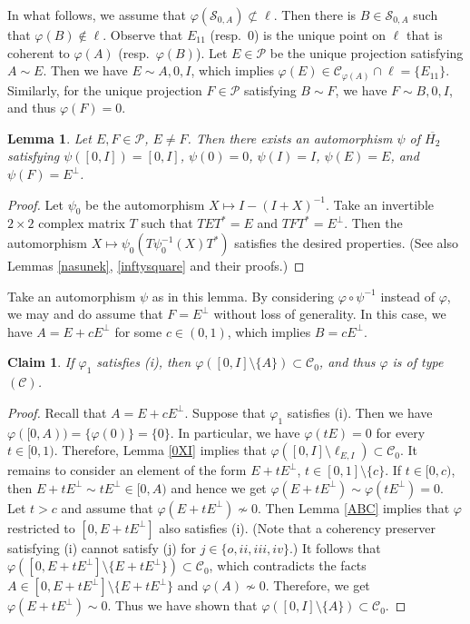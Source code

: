 \documentclass[10pt]{amsart}
\newtheorem{lemma}[theorem]{Lemma}
\newtheorem{claim}[theorem]{Claim}
\theoremstyle{definition}
\theoremstyle{remark}
\numberwithin{subsection}{section}
\numberwithin{equation}{section}
\newcommand\cC{{\mathcal{C}}}
\newcommand\cP{{\mathcal{P}}}
\newcommand\oH{{\overline{H_2}}}
\begin{document}
In what follows, we assume that $\varphi(\mathcal{S}_{0, A})\not\subset \ell$.
Then there is $B\in \mathcal{S}_{0, A}$ such that $\varphi(B)\notin \ell$. 
Observe that $E_{11}$ (resp.\ $0$) is the unique point on $\ell$ that is coherent to $\varphi(A)$ (resp.\ $\varphi(B)$).
Let $E\in\mathcal{P}$ be the unique projection satisfying $A\sim E$.
Then we have $E\sim A, 0, I$, which implies $\varphi(E)\in \cC_{\varphi(A)} \cap \ell=\{E_{11}\}$. 
Similarly, for the unique projection $F\in\mathcal{P}$ satisfying $B\sim F$, we have $F\sim B, 0, I$, and thus $\varphi(F)=0$. 

\begin{lemma}\label{kicmabol}
Let $E,F \in \cP$, $E \not= F$. 
Then there exists an automorphism $\psi$ of $\oH$ satisfying $\psi([0,I])=[0,I]$,  $\psi (0) = 0$, $\psi (I) = I$, $\psi (E) = E$, and $\psi (F) = E^\perp$.
\end{lemma}
\begin{proof}
Let $\psi_0$ be the automorphism $X\mapsto I-(I+X)^{-1}$.
Take an invertible $2 \times 2$ complex matrix $T$ such that $TET^\ast = E$ and $TFT^\ast = E^\perp$. 
Then the automorphism $X\mapsto \psi_0(T\psi_0^{-1}(X)T^\ast)$ satisfies the desired properties.
(See also Lemmas \ref{nasunek}, \ref{inftysquare} and their proofs.)
\end{proof}

Take an automorphism $\psi$ as in this lemma. 
By considering $\varphi\circ \psi^{-1}$ instead of $\varphi$, we may and do assume that $F=E^\perp$ without loss of generality. 
In this case, we have $A=E+cE^\perp$ for some $c\in (0,1)$,  which implies $B=cE^\perp$. 




\begin{claim}\label{1i}
If $\varphi_1$ satisfies (i), then $\varphi([0, I]\setminus\{A\})\subset \cC_0$, and thus $\varphi$ is of type $(\mathcal{C})$.
\end{claim}
\begin{proof}
Recall that $A=E+cE^\perp$.
Suppose that $\varphi_1$ satisfies (i).
Then we have $\varphi([0, A)) =\{\varphi(0)\}=\{0\}$. 
In particular, we have $\varphi(tE)=0$ for every $t\in [0,1)$. 
Therefore, Lemma \ref{0XI} implies that $\varphi([0,I]\setminus\ell_{E, I})\subset \cC_0$.
It remains to consider an element of the form $E+tE^\perp$, $t\in [0,1]\setminus\{c\}$.
If $t\in [0,c)$, then $E+tE^\perp\sim tE^\perp\in [0,A)$ and hence we get $\varphi(E+tE^\perp)\sim \varphi(tE^\perp)=0$.
Let $t>c$
and assume that $\varphi(E+tE^\perp)\not\sim 0$.
Then Lemma \ref{ABC} implies that $\varphi$ restricted to $[0,E+tE^\perp]$ also satisfies (i). 
(Note that a coherency preserver satisfying (i) cannot satisfy (j) for $j\in \{o, ii, iii, iv\}$.)
It follows that $\varphi([0,E+tE^\perp]\setminus\{E+tE^\perp\})\subset \mathcal{C}_0$, which contradicts the facts $A\in [0,E+tE^\perp]\setminus\{E+tE^\perp\}$ and $\varphi(A)\not\sim 0$. 
Therefore, we get $\varphi(E+tE^\perp)\sim 0$.
Thus we have shown that $\varphi([0, I]\setminus\{A\})\subset \cC_0$.
\end{proof}
\end{document}
